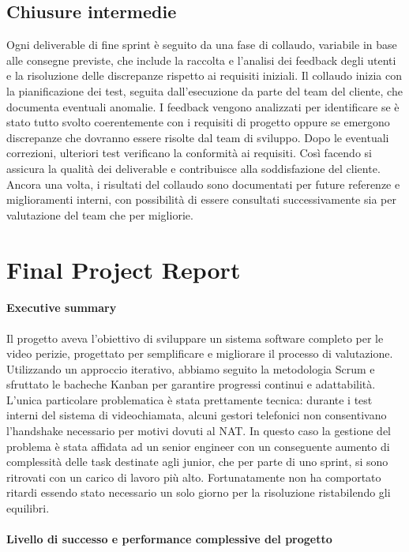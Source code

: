 \documentclass[a4paper,12pt, openright]{report}
\begin{document}
\subsection{Chiusure intermedie}
Ogni deliverable di fine sprint è seguito da una fase di collaudo, variabile in base alle consegne previste, che include la raccolta e l'analisi dei feedback degli utenti e la risoluzione delle discrepanze rispetto ai requisiti iniziali. Il collaudo inizia con la pianificazione dei test, seguita dall'esecuzione da parte del team del cliente, che documenta eventuali anomalie. I feedback vengono analizzati per identificare se è stato tutto svolto coerentemente con i requisiti di progetto oppure se emergono discrepanze che dovranno essere risolte dal team di sviluppo. Dopo le eventuali correzioni, ulteriori test verificano la conformità ai requisiti. Così facendo si assicura la qualità dei deliverable e contribuisce alla soddisfazione del cliente.
Ancora una volta, i risultati del collaudo sono documentati per future referenze e miglioramenti interni, con possibilità di essere consultati successivamente sia per valutazione del team che per migliorie.

\section{Final Project Report}

\paragraph{Executive summary}

Il progetto aveva l'obiettivo di sviluppare un sistema software completo per le video perizie, progettato per semplificare e migliorare il processo di valutazione. Utilizzando un approccio iterativo, abbiamo seguito la metodologia Scrum e sfruttato le bacheche Kanban per garantire progressi continui e adattabilità.
L'unica particolare problematica è stata prettamente tecnica: durante i test interni del sistema di videochiamata, alcuni gestori telefonici non consentivano l'handshake necessario per motivi dovuti al NAT. In questo caso la gestione del problema è stata affidata ad un senior engineer con un conseguente aumento di complessità delle task destinate agli junior, che per parte di uno sprint, si sono ritrovati con un carico di lavoro più alto. Fortunatamente non ha comportato ritardi essendo stato necessario un solo giorno per la risoluzione ristabilendo gli equilibri. 

\paragraph{Livello di successo e performance complessive del progetto}
\end{document}
